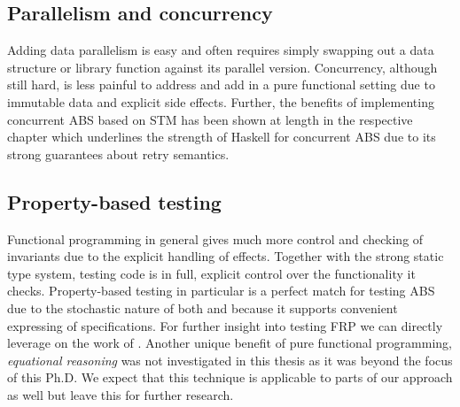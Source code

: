 %
%
%	
%	

\subsection{Parallelism and concurrency}
Adding data parallelism is easy and often requires simply swapping out a data structure or library function against its parallel version. Concurrency, although still hard, is less painful to address and add in a pure functional setting due to immutable data and explicit side effects. Further, the benefits of implementing concurrent ABS based on STM has been shown at length in the respective chapter which underlines the strength of Haskell for concurrent ABS due to its strong guarantees about retry semantics. 

\subsection{Property-based testing}
Functional programming in general gives much more control and checking of invariants due to the explicit handling of effects. Together with the strong static type system, testing code is in full, explicit control over the functionality it checks. Property-based testing in particular is a perfect match for testing ABS due to the stochastic nature of both and because it supports convenient expressing of specifications. %
For further insight into testing FRP we can directly leverage on the work of \cite{perez_testing_2017}. Another unique benefit of pure functional programming, \textit{equational reasoning} was not investigated in this thesis as it was beyond the focus of this Ph.D. We expect that this technique is applicable to parts of our approach as well but leave this for further research.

